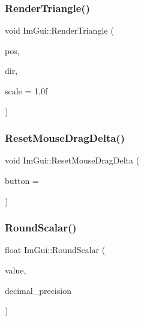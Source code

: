 \subsubsection{\texorpdfstring{Render\+Triangle()}{RenderTriangle()}}
{\footnotesize\ttfamily void Im\+Gui\+::\+Render\+Triangle (\begin{DoxyParamCaption}\item[{\hyperlink{struct_im_vec2}{Im\+Vec2}}]{pos,  }\item[{Im\+Gui\+Dir}]{dir,  }\item[{float}]{scale = {\ttfamily 1.0f} }\end{DoxyParamCaption})}

\hypertarget{namespace_im_gui_aa03f31a184cafdf506feb2e8ba07f91e}{}\label{namespace_im_gui_aa03f31a184cafdf506feb2e8ba07f91e} 
\subsubsection{\texorpdfstring{Reset\+Mouse\+Drag\+Delta()}{ResetMouseDragDelta()}}
{\footnotesize\ttfamily void Im\+Gui\+::\+Reset\+Mouse\+Drag\+Delta (\begin{DoxyParamCaption}\item[{int}]{button = {} }\end{DoxyParamCaption})}

\hypertarget{namespace_im_gui_ab1826c569a8f3296b9723a2148013d28}{}\label{namespace_im_gui_ab1826c569a8f3296b9723a2148013d28} 
\subsubsection{\texorpdfstring{Round\+Scalar()}{RoundScalar()}}
{\footnotesize\ttfamily float Im\+Gui\+::\+Round\+Scalar (\begin{DoxyParamCaption}\item[{float}]{value,  }\item[{int}]{decimal\+\_\+precision }\end{DoxyParamCaption})}

\hypertarget{namespace_im_gui_a9a01bed1445b5b7edaf0af6a31c08d2c}{}\label{namespace_im_gui_a9a01bed1445b5b7edaf0af6a31c08d2c} 
